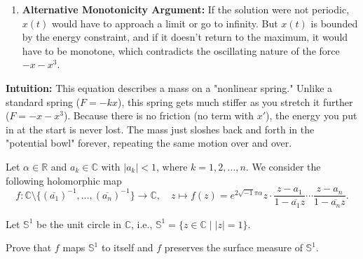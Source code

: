 \begin{solution}
\begin{enumerate}
    \item \textbf{Alternative Monotonicity Argument:} If the solution were not periodic, $x(t)$ would have to approach a limit or go to infinity. But $x(t)$ is bounded by the energy constraint, and if it doesn't return to the maximum, it would have to be monotone, which contradicts the oscillating nature of the force $-x-x^3$.
\end{enumerate}

\bigskip

\textbf{Intuition:} 
This equation describes a mass on a "nonlinear spring." Unlike a standard spring ($F = -kx$), this spring gets much stiffer as you stretch it further ($F = -x - x^3$). Because there is no friction (no term with $x'$), the energy you put in at the start is never lost. The mass just sloshes back and forth in the "potential bowl" forever, repeating the same motion over and over.
\end{solution}

\begin{exercise}
\label{analysis:2020:6}
Let $\alpha\in\mathbb{R}$ and $a_k\in\mathbb{C}$ with $|a_k|<1$, where $k=1,2,\ldots,n$. We consider the following holomorphic map
\[
f:\mathbb{C}\setminus\{(\overline{a_1})^{-1},\dots,(\overline{a_n})^{-1}\}\to\mathbb{C},\quad z\mapsto f(z) = e^{2\sqrt{-1}\pi\alpha}z\cdot\frac{z-a_1}{1-\overline{a_1}z}\cdots\frac{z-a_n}{1-\overline{a_n}z}.
\]

Let $\mathbb{S}^1$ be the unit circle in $\mathbb{C}$, i.e., $\mathbb{S}^1 = \{z\in\mathbb{C}\mid |z|=1\}$.

Prove that $f$ maps $\mathbb{S}^1$ to itself and $f$ preserves the surface measure of $\mathbb{S}^1$.

\end{exercise}

